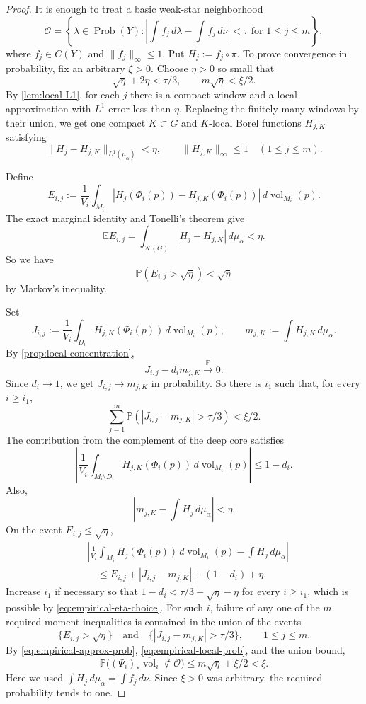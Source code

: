\documentclass[10pt,a4paper]{amsart}
\newcommand{\Prob}{\operatorname{Prob}}
\newcommand{\cN}{\mathcal N}
\newcommand{\cO}{\mathcal O}
\newcommand{\dbar}{\overline{\vol}}
\newcommand{\vol}{\operatorname{vol}}
\begin{document}
\begin{proof}
It is enough to treat a basic weak-star neighborhood
\[
 \cO=\left\{\lambda\in\Prob(Y):
 \left|\int f_j\,d\lambda-\int f_j\,d\nu\right|<\tau
 \text{ for }1\leq j\leq m\right\},
\]
where $f_j\in C(Y)$ and $\|f_j\|_\infty\leq1$. Put $H_j:=f_j\circ\pi$. To prove convergence in probability, fix an
arbitrary $\xi>0$. Choose $\eta>0$ so small that
\begin{equation}\label{eq:empirical-eta-choice}
 \sqrt\eta+2\eta<\tau/3,
 \qquad m\sqrt\eta<\xi/2.
\end{equation}
By \cref{lem:local-L1}, for each $j$ there is a compact window and a local approximation with $L^1$ error less than $\eta$. Replacing the finitely many windows by their union, we get one compact $K\subset G$ and $K$-local Borel functions $H_{j,K}$ satisfying
\[
 \|H_j-H_{j,K}\|_{L^1(\mu_\alpha)}<\eta,
 \qquad \|H_{j,K}\|_\infty\leq1
 \quad(1\leq j\leq m).
\]

Define
\[
 E_{i,j}:=\frac1{V_i}\int_{M_i}
 |H_j(\Phi_i(p))-H_{j,K}(\Phi_i(p))|\,d\vol_{M_i}(p).
\]
The exact marginal identity and Tonelli's theorem give
\[
 \mathbb E E_{i,j}
 =\int_{\cN(G)}|H_j-H_{j,K}|\,d\mu_\alpha<\eta.
\]
So we have
\begin{equation}\label{eq:empirical-approx-prob}
 \mathbb P(E_{i,j}>\sqrt\eta)<\sqrt\eta
\end{equation}
by Markov's inequality.

Set
\[
 J_{i,j}:=\frac1{V_i}\int_{D_i}H_{j,K}(\Phi_i(p))\,d\vol_{M_i}(p),
 \qquad m_{j,K}:=\int H_{j,K}\,d\mu_\alpha.
\]
By \cref{prop:local-concentration},
\[
 J_{i,j}-d_i m_{j,K}\xrightarrow{\mathbb P}0.
\]
Since $d_i\to1$, we get $J_{i,j}\to m_{j,K}$ in probability.
So there is $i_1$ such that, for every $i\geq i_1$,
\begin{equation}\label{eq:empirical-local-prob}
 \sum_{j=1}^m
 \mathbb P\left(|J_{i,j}-m_{j,K}|>\tau/3\right)<\xi/2.
\end{equation}
The contribution from the complement of the deep core satisfies
\[
 \left|\frac1{V_i}\int_{M_i\setminus D_i}
 H_{j,K}(\Phi_i(p))\,d\vol_{M_i}(p)\right|
 \leq1-d_i.
\]
Also,
\[
 |m_{j,K}-\int H_j\,d\mu_\alpha|<\eta.
\]
On the event $E_{i,j}\leq\sqrt\eta$,
\begin{align*}
 &\left|\frac1{V_i}\int_{M_i}H_j(\Phi_i(p))\,d\vol_{M_i}(p)
 -\int H_j\,d\mu_\alpha\right|\\
 &\quad\leq E_{i,j}+|J_{i,j}-m_{j,K}|+(1-d_i)+\eta.
\end{align*}
Increase $i_1$ if necessary so that
$1-d_i<\tau/3-\sqrt\eta-\eta$ for every $i\geq i_1$, which is possible by
\eqref{eq:empirical-eta-choice}. For such $i$, failure of any one of the $m$
required moment inequalities is contained in the union of the events
\[
 \{E_{i,j}>\sqrt\eta\}
 \quad\text{and}\quad
 \{|J_{i,j}-m_{j,K}|>\tau/3\},
 \qquad 1\leq j\leq m.
\]
By \eqref{eq:empirical-approx-prob},
\eqref{eq:empirical-local-prob}, and the union bound,
\[
 \mathbb P\bigl((\Psi_i)_*\dbar_i\notin\cO\bigr)
 \leq m\sqrt\eta+\xi/2<\xi.
\]
Here we used $\int H_j\,d\mu_\alpha=\int f_j\,d\nu$. Since $\xi>0$ was
arbitrary, the required probability tends to one.
\end{proof}
\end{document}
